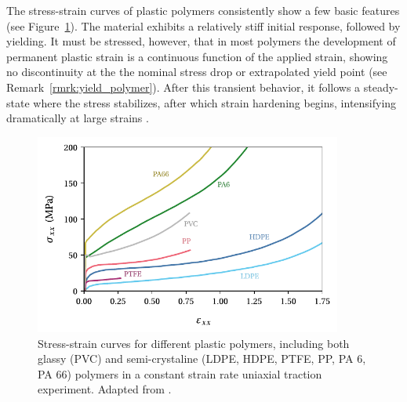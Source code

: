 The stress-strain curves of plastic polymers consistently show a few basic features (see Figure~\ref{fig:response_plastic_polymer}).
The material exhibits a relatively stiff initial response, followed by yielding.
It must be stressed, however, that in most polymers the development of permanent plastic strain is a continuous function of the applied strain, showing no discontinuity at the the nominal stress drop or extrapolated yield point \citep{wardReviewYieldBehaviour1971} (see Remark~\ref{rmrk:yield_polymer}).
After this transient behavior, it follows a steady-state where the stress stabilizes, after which strain hardening begins, intensifying dramatically at large strains \citep{hissNetworkStretchingSlip1999,callister2014materials,makradiTwophaseSelfconsistentModel2005}.
\begin{figure}[hbp]
	\centering
	\includegraphics[width=0.9\textwidth]{figures/response_plastic_polymer}
	\caption{Stress-strain curves for different plastic polymers, including both glassy (PVC) and semi-crystaline (LDPE, HDPE, PTFE, PP, PA 6, PA 66) polymers in a constant strain rate uniaxial traction experiment. Adapted from \cite{gsellYieldTransientEffects1981}.}
\label{fig:response_plastic_polymer}
\end{figure}


